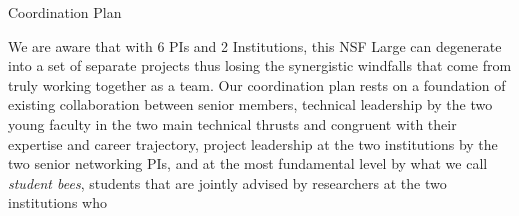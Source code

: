 \documentclass[10pt]{article}
\begin{document}
 \begin{Large}
\begin{center}
Coordination Plan
\end{center}
\end{Large}



We are aware that with 6 PIs and 2 Institutions, this NSF Large can degenerate into a set of 
separate projects thus losing the synergistic windfalls that come from truly working together as
a team. Our coordination plan rests on a foundation of existing collaboration between senior members,  technical leadership by the two young faculty in the two main technical thrusts and
congruent with their expertise and career trajectory, project leadership at the two
institutions by the two senior networking PIs, and at the most fundamental level by what we
call \emph{student bees}, students that are jointly advised by researchers at the two institutions who
\end{document}
